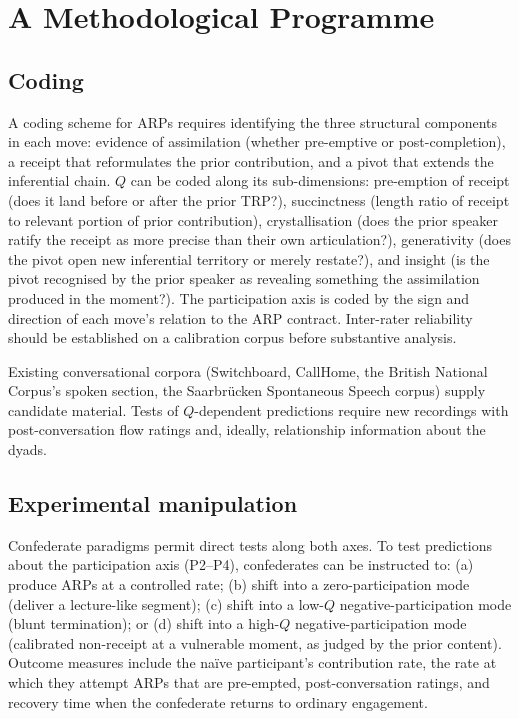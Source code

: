 \section{A Methodological Programme}\label{sec:methods}

\subsection{Coding}

A coding scheme for ARPs requires identifying the three structural components in each move: evidence of assimilation (whether pre-emptive or post-completion), a receipt that reformulates the prior contribution, and a pivot that extends the inferential chain. $Q$ can be coded along its sub-dimensions: pre-emption of receipt (does it land before or after the prior TRP?), succinctness (length ratio of receipt to relevant portion of prior contribution), crystallisation (does the prior speaker ratify the receipt as more precise than their own articulation?), generativity (does the pivot open new inferential territory or merely restate?), and insight (is the pivot recognised by the prior speaker as revealing something the assimilation produced in the moment?). The participation axis is coded by the sign and direction of each move's relation to the ARP contract. Inter-rater reliability should be established on a calibration corpus before substantive analysis.

Existing conversational corpora (Switchboard, CallHome, the British National Corpus's spoken section, the Saarbrücken Spontaneous Speech corpus) supply candidate material. Tests of $Q$-dependent predictions require new recordings with post-conversation flow ratings and, ideally, relationship information about the dyads.

\subsection{Experimental manipulation}

Confederate paradigms permit direct tests along both axes. To test predictions about the participation axis (P2--P4), confederates can be instructed to: (a) produce ARPs at a controlled rate; (b) shift into a zero-participation mode (deliver a lecture-like segment); (c) shift into a low-$Q$ negative-participation mode (blunt termination); or (d) shift into a high-$Q$ negative-participation mode (calibrated non-receipt at a vulnerable moment, as judged by the prior content). Outcome measures include the naïve participant's contribution rate, the rate at which they attempt ARPs that are pre-empted, post-conversation ratings, and recovery time when the confederate returns to ordinary engagement.

